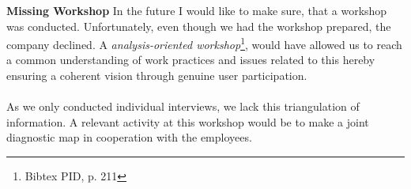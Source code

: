 \textbf{Missing Workshop}
In the future I would like to make sure, that a workshop was conducted. Unfortunately, even though we had the workshop prepared, the company declined. A \textit{analysis-oriented workshop}\footnote{Bibtex PID, p. 211}, would have allowed us to reach a common understanding of work practices and issues related to this hereby ensuring a coherent vision through genuine user participation. 
\\\\
As we only conducted individual interviews, we lack this triangulation of information. A relevant activity at this workshop would be to make a joint diagnostic map in cooperation with the employees.